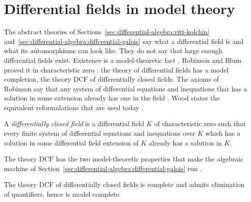 \section{Differential fields in model theory}\label{sec:differential-algebra:model-theory}

The abstract theories of
Sections~\ref{sec:differential-algebra:ritt-kolchin}
and~\ref{sec:differential-algebra:differential-galois} say what a
differential field is and what its automorphisms can look like. They do
not say that large enough differential fields exist. Existence is a
model-theoretic fact \cite[pp.~129--132]{Wood1998DifferentiallyClosed}.
Robinson and Blum proved it in
characteristic zero \cite[pp.~129--132]{Wood1998DifferentiallyClosed}:
the theory of differential fields has a model completion, the theory
$\mathrm{DCF}$ of differentially closed fields. The axioms of Robinson
say
that any system of differential equations and inequations that has a
solution in some extension already has one in the field
\cite[p.~131]{Wood1998DifferentiallyClosed}. Wood states the equivalent
reformulations that are used today
\cite[pp.~129--134]{Wood1998DifferentiallyClosed}.

\begin{definition}\label{def:diffalg:dcf}
A \emph{differentially closed field} is a differential field $K$ of
characteristic zero such that every finite system of differential
equations and inequations over $K$ which has a solution in some
differential field extension of $K$ already has a solution in $K$.
\end{definition}

The theory $\mathrm{DCF}$ has the two model-theoretic properties that
make the algebraic machine of
Section~\ref{sec:differential-algebra:differential-galois} run
\cite[pp.~129--134]{Wood1998DifferentiallyClosed}.

\begin{theorem}\label{thm:diffalg:dcf-complete-qe}
The theory $\mathrm{DCF}$ of differentially closed fields is complete
and admits elimination of quantifiers, hence is model complete.
\end{theorem}

